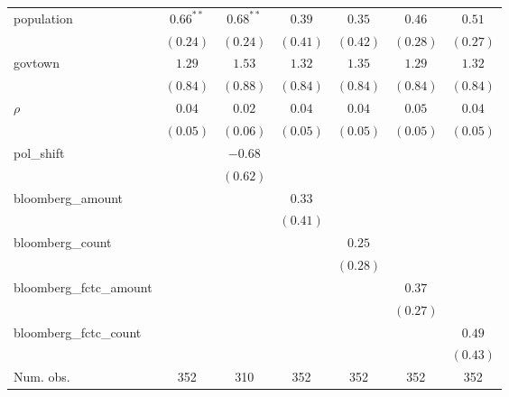 \begin{table}[!h]
\begin{center}
\begin{tabular}{l c c c c c c }
population              & $0.66^{**}$  & $0.68^{**}$  & $0.39$       & $0.35$       & $0.46$       & $0.51$       \\
                        & $(0.24)$     & $(0.24)$     & $(0.41)$     & $(0.42)$     & $(0.28)$     & $(0.27)$     \\
govtown                 & $1.29$       & $1.53$       & $1.32$       & $1.35$       & $1.29$       & $1.32$       \\
                        & $(0.84)$     & $(0.88)$     & $(0.84)$     & $(0.84)$     & $(0.84)$     & $(0.84)$     \\
$\rho$                  & $0.04$       & $0.02$       & $0.04$       & $0.04$       & $0.05$       & $0.04$       \\
                        & $(0.05)$     & $(0.06)$     & $(0.05)$     & $(0.05)$     & $(0.05)$     & $(0.05)$     \\
pol\_shift              &              & $-0.68$      &              &              &              &              \\
                        &              & $(0.62)$     &              &              &              &              \\
bloomberg\_amount       &              &              & $0.33$       &              &              &              \\
                        &              &              & $(0.41)$     &              &              &              \\
bloomberg\_count        &              &              &              & $0.25$       &              &              \\
                        &              &              &              & $(0.28)$     &              &              \\
bloomberg\_fctc\_amount &              &              &              &              & $0.37$       &              \\
                        &              &              &              &              & $(0.27)$     &              \\
bloomberg\_fctc\_count  &              &              &              &              &              & $0.49$       \\
                        &              &              &              &              &              & $(0.43)$     \\
\midrule
Num. obs.               & 352          & 310          & 352          & 352          & 352          & 352          \\

\end{tabular}
\end{center}
\end{table}
